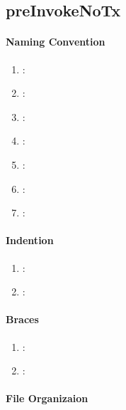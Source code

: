 \subsection{preInvokeNoTx} %
\label{sub:preinvokenotx}

\paragraph{Naming Convention} %
\label{par:naming_convention}

\begin{enumerate}
	\item \emph{\checkA}:
	\item \emph{\checkB}:
	\item \emph{\checkC}:
	\item \emph{\checkD}:
	\item \emph{\checkE}:
	\item \emph{\checkF}:
	\item \emph{\checkG}:
\end{enumerate}

\paragraph{Indention} %
\label{par:indention}

\begin{enumerate} [resume]
	\item \emph{\checkH}:
	\item \emph{\checkI}:
\end{enumerate}

\paragraph{Braces} %
\label{par:braces}

\begin{enumerate} [resume]
	\item \emph{\checkJ}:
	\item \emph{\checkK}:
\end{enumerate}

\paragraph{File Organizaion} %
\label{par:file_organizaion}

